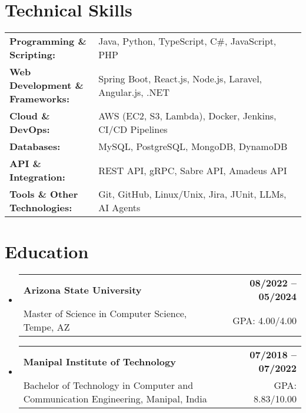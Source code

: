 \documentclass[letterpaper,11pt]{article}
\makeatletter
\newcommand{\educationSubheading}[4]{
  \vspace{-2pt}\item
    \begin{tabular*}{1.0\textwidth}[t]{l@{\extracolsep{\fill}}r}
      \textbf{\small #1} & \textbf{\small #2} \\
      {\small#3} & {\small #4} \\
    \end{tabular*}\vspace{-7pt}
}
\newcommand{\resumeSubHeadingListStart}{\begin{itemize}[leftmargin=0pt, label={}]}
\newcommand{\resumeSubHeadingListEnd}{\end{itemize}}
\makeatother
\begin{document}
\section{Technical Skills}
        \vspace{-14pt}
        \begin{table}[h]
            \footnotesize
            \begin{tabular}{p{0.3\linewidth} p{0.7\linewidth}}
                \textbf{Programming \& Scripting:} & Java, Python, TypeScript, C\#, JavaScript, PHP \\
                \textbf{Web Development \& Frameworks:} & Spring Boot, React.js, Node.js, Laravel, Angular.js, .NET \\
                \textbf{Cloud \& DevOps:} & AWS (EC2, S3, Lambda), Docker, Jenkins, CI/CD Pipelines \\
                \textbf{Databases:} & MySQL, PostgreSQL, MongoDB, DynamoDB \\
                \textbf{API \& Integration:} & REST API, gRPC, Sabre API, Amadeus API \\
                \textbf{Tools \& Other Technologies:} & Git, GitHub, Linux/Unix, Jira, JUnit, LLMs, AI Agents \\
            \end{tabular}
        \end{table}

 \vspace{-15pt}

\section{Education}
  \resumeSubHeadingListStart
    \educationSubheading
      {Arizona State University}{08/2022 -- 05/2024}
      {Master of Science in Computer Science, Tempe, AZ}{GPA: 4.00/4.00}

    \educationSubheading
      {Manipal Institute of Technology}{07/2018 -- 07/2022}
      {Bachelor of Technology in Computer and Communication Engineering, Manipal, India}{GPA: 8.83/10.00}
  \resumeSubHeadingListEnd
\end{document}
